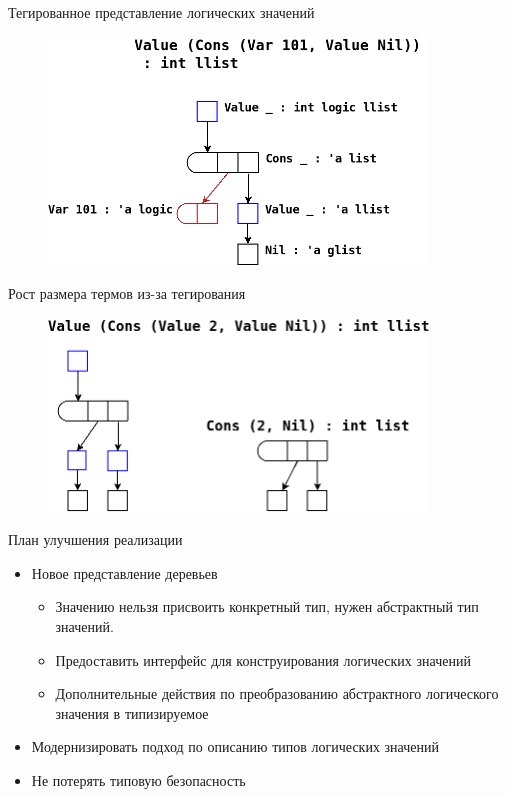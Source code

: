 \documentclass[10pt, mathserif]{beamer}
\theoremstyle{definition}
\begin{document}
\begin{frame}[fragile]{Тегированное представление логических значений}
  \begin{figure}
  \centering
  \includegraphics[width=0.9\textwidth]{img3.png}
  \end{figure}
\end{frame}

\begin{frame}[fragile]{Рост размера термов из-за тегирования}
\begin{figure}
\centering
\includegraphics[width=0.9\textwidth]{img4.png}
\end{figure}
\end{frame}

\begin{frame}[fragile]{План улучшения реализации}
  \begin{itemize}
  \item Новое представление деревьев
    \begin{itemize}
      \item{Значению нельзя присвоить конкретный тип, нужен абстрактный тип значений.}
      \item{Предоставить интерфейс для конструирования логических значений}
      \item{Дополнительные действия по преобразованию абстрактного логического значения в типизируемое}
    \end{itemize}
  \item Модернизировать подход по описанию типов логических значений
  \item Не потерять типовую безопасность
  \end{itemize}
\end{frame}
\end{document}
